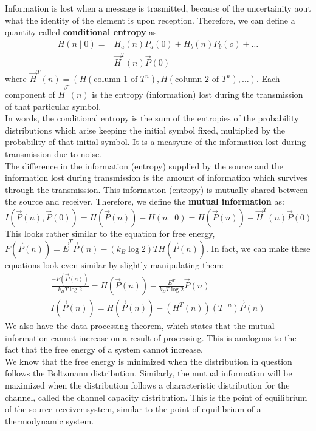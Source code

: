\documentclass[letterpaper,10pt,english]{article}
\begin{document}
Information is lost when a message is trasmitted, because of the uncertainity aout what the identity of the element is upon reception. Therefore, we can define a quantity called \textbf{conditional entropy} as{
\begin{align*}
H(n \mid 0)=&H_a (n) P_a(0)+H_b(n) P_b (o)+ \ldots \\
=&\vec{H}^T (n) \vec{P}(0)
\end{align*}
where $\vec{H}^T (n)=\left( H(\text{column 1 of } T^n), H(\text{column 2 of } T^n), \ldots \right)$. Each component of $\vec{H}^T (n)$ is the entropy (information) lost during the transmission of that particular symbol. \\
In words, the conditional entropy is the sum of the entropies of the probability distributions which arise keeping the initial symbol fixed, multiplied by the probability of that initial symbol. It is a measyure of the information lost during transmission due to noise. \\
The difference in the information (entropy) supplied by the source and the information lost during transmission is the amount of information which survives through the transmission. This information (entropy) is mutually shared between the source and receiver. Therefore, we define the \textbf{mutual information} as:
\begin{equation}
I (\vec{P}(n), \vec{P}(0))=H(\vec{P}(n))-H(n \mid 0)=H(\vec{P}(n))-\vec{H}^T (n) \vec{P}(0)
\end{equation}
This looks rather similar to the equation for free energy, $F(\vec{P}(n))=\vec{E}^{T} \vec{P}(n)-(k_B \log 2) T  H(\vec{P}(n))$. In fact, we can make these equations look even similar by slightly manipulating them:
\begin{align*}
\frac{-F(\vec{P}(n))}{ k_B T \log 2 }=H(\vec{P}(n))-\frac{E^T}{ k_B T \log 2} \vec{P}(n) \\
I(\vec{P}(n))=H(\vec{P}(n)) - (H^T (n)) (T^{-n}) \vec{P}(n)
\end{align*}
We also have the data processing theorem, which states that the mutual information cannot increase on a result of processing. This is analogous to the fact that the free energy of a system cannot increase. \\
We know that the free energy is minimized when the distribution in question follows the Boltzmann distribution. Similarly, the mutual information will be maximized when the distribution follows a characteristic distribution for the channel, called the channel capacity distribution. This is the point of equilibrium of the source-receiver system, similar to the point of equilibrium of a thermodynamic system. 
}
\end{document}
